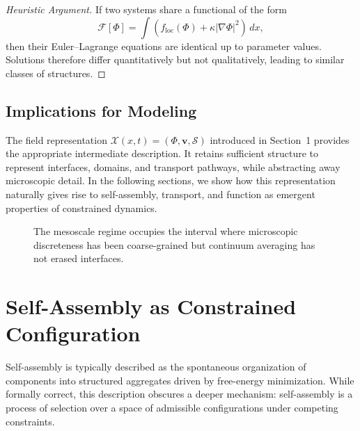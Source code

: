 \documentclass[11pt, a4paper, twocolumn]{article}
\newcommand{\X}{\mathcal{X}}
\newcommand{\Sfield}{\mathcal{S}}
\newcommand{\F}{\mathcal{F}}
\begin{document}
\begin{proof}[Heuristic Argument]
If two systems share a functional of the form
\[
    \F[\Phi] = \int \left( f_{\mathrm{loc}}(\Phi) + \kappa |\nabla \Phi|^2 \right)\,dx,
\]
then their Euler--Lagrange equations are identical up to parameter values.
Solutions therefore differ quantitatively but not qualitatively, leading to
similar classes of structures.
\end{proof}

\subsection{Implications for Modeling}

The field representation $\X(x,t) = (\Phi, \mathbf{v}, \Sfield)$ introduced
in Section~1 provides the appropriate intermediate description. It retains
sufficient structure to represent interfaces, domains, and transport pathways,
while abstracting away microscopic detail. In the following sections, we show
how this representation naturally gives rise to self-assembly, transport, and
function as emergent properties of constrained dynamics.

\begin{figure}[ht]
\centering
{}
\caption{The mesoscale regime occupies the interval where microscopic discreteness has been coarse-grained but continuum averaging has not erased interfaces.}
\end{figure}

\section{Self-Assembly as Constrained Configuration}

Self-assembly is typically described as the spontaneous organization of
components into structured aggregates driven by free-energy minimization.
While formally correct, this description obscures a deeper mechanism:
self-assembly is a process of selection over a space of admissible
configurations under competing constraints.
\end{document}
